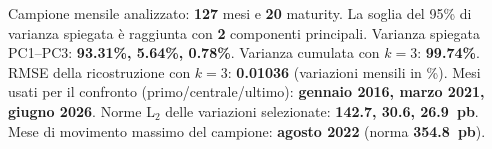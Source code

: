 Campione mensile analizzato: \textbf{127} mesi e \textbf{20} maturity.
La soglia del 95\% di varianza spiegata \`e raggiunta con \textbf{2} componenti principali.
Varianza spiegata PC1--PC3: \textbf{93.31\%, 5.64\%, 0.78\%}.
Varianza cumulata con $k=3$: \textbf{99.74\%}.
RMSE della ricostruzione con $k=3$: \textbf{0.01036} (variazioni mensili in \%).
Mesi usati per il confronto (primo/centrale/ultimo): \textbf{gennaio 2016, marzo 2021, giugno 2026}.
Norme L$_2$ delle variazioni selezionate: \textbf{142.7, 30.6, 26.9~pb}.
Mese di movimento massimo del campione: \textbf{agosto 2022} (norma \textbf{354.8~pb}).
